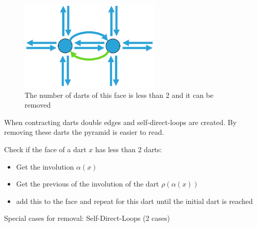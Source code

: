 \documentclass[12pt]{article}
\newif\ifdebug
\newcommand{\todo}[1]{\ifdebug \textcolor{red}{\textit{\textbf{TODO:}} #1}\else \fi}    %
\begin{document}
\begin{figure}[tb]
  \centering
  \includegraphics[width=0.6\textwidth]{img/face.pdf}
  \caption{The number of darts of this face is less than 2 and it can be removed}
  \label{fig:faces}
\end{figure}

When contracting darts double edges and self-direct-loops are created. By removing these darts the pyramid is easier to read.
\todo{faster to compute check}

Check if the face of a dart \(x\) has less than 2 darts:

\begin{itemize}
  \item Get the involution \(\alpha(x)\)
  \item Get the previous of the involution of the dart \(\rho(\alpha(x))\)
  \item add this to the face and repeat for this dart until the initial dart is reached
\end{itemize}

Special cases for removal:
Self-Direct-Loops (2 cases)
\end{document}
